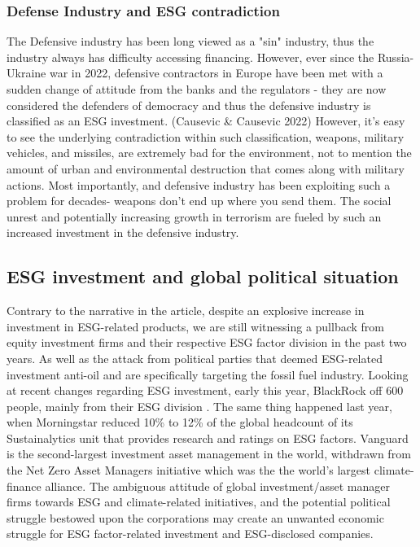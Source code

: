 \documentclass[a4paper, 12pt]{article}
\begin{document}
\vspace{-5pt}
\subsubsection{Defense Industry and ESG contradiction}\label{Defense Industry and ESG contradiction}
\vspace{-10pt}
\hspace{12pt} The Defensive industry has been long viewed as a "sin" industry, thus the industry always has difficulty accessing financing. However, ever since the Russia-Ukraine war in 2022, defensive contractors in Europe have been met with a sudden change of attitude from the banks and the regulators - they are now considered the defenders of democracy and thus the defensive industry is classified as an ESG investment. (Causevic \& Causevic 2022)\cite{Causevic} However, it's easy to see the underlying contradiction within such classification, weapons, military vehicles, and missiles, are extremely bad for the environment, not to mention the amount of urban and environmental destruction that comes along with military actions. Most importantly, and defensive industry has been exploiting such a problem for decades- weapons don't end up where you send them. The social unrest and potentially increasing growth in terrorism are fueled by such an increased investment in the defensive industry. 

\vspace{-5pt}
\subsection{ESG investment and global political situation}\label{ESG investment and global political situation}
\vspace{-10pt}
\hspace{10pt} Contrary to the narrative in the article, despite an explosive increase in investment in ESG-related products, we are still witnessing a pullback from equity investment firms and their respective ESG factor division in the past two years. As well as the attack from political parties that deemed ESG-related investment anti-oil and are specifically targeting the fossil fuel industry. Looking at recent changes regarding ESG investment, early this year, BlackRock off 600 people, mainly from their ESG division \cite{Fox}. The same thing happened last year, when Morningstar reduced 10\% to 12\% of the global headcount of its Sustainalytics unit that provides research and ratings on ESG factors\cite{R}. Vanguard is the second-largest investment asset management in the world, withdrawn from the Net Zero Asset Managers initiative which was the the world’s largest climate-finance alliance\cite{Vanguard}. The ambiguous attitude of global investment/asset manager firms towards ESG and climate-related initiatives, and the potential political struggle bestowed upon the corporations may create an unwanted economic struggle for ESG factor-related investment and ESG-disclosed companies. 
\end{document}

